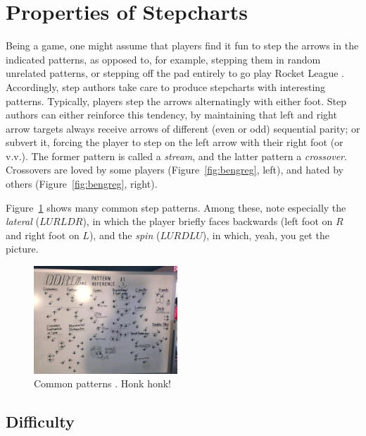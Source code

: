 \documentclass[10pt]{sigplanconf}
\begin{document}

\section{Properties of Stepcharts}

Being a game, one might assume that players find it fun to step the arrows in the indicated patterns, as opposed to, for example, stepping them in random unrelated patterns, or stepping off the pad entirely to go play Rocket League \cite{rocketleague}.
Accordingly, step authors take care to produce stepcharts with interesting patterns.
Typically, players step the arrows alternatingly with either foot.
Step authors can either reinforce this tendency, by maintaining that left and right arrow targets always receive arrows of different (even or odd) sequential parity;
or subvert it, forcing the player to step on the left arrow with their right foot (or v.v.).
The former pattern is called a {\em stream}, and the latter pattern a {\em crossover}. Crossovers are loved by some players (Figure~\ref{fig:bengreg}, left), and hated by others (Figure~\ref{fig:bengreg}, right).

Figure~\ref{fig:patterns} shows many common step patterns.
Among these, note especially the {\em lateral} ($LURLDR$), in which the player briefly faces backwards (left foot on $R$ and right foot on $L$), and the {\em spin} ($LURDLU$), in which, yeah, you get the picture.

\begin{figure}[t]
	\begin{center}
	\includegraphics[width=0.48\textwidth]{patterns.jpg}
	\end{center}
	\caption{Common patterns \cite{patterns}. Honk honk!}
	\label{fig:patterns}
\end{figure}

\subsection{Difficulty}
\end{document}
